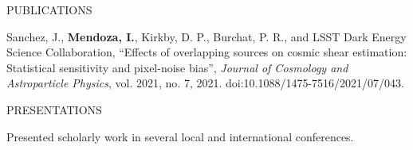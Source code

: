 \documentclass{resume} %
\begin{document}
\begin{rSection}{PUBLICATIONS}
%
\vspace*{-1em}
\item Sanchez, J., \textbf{Mendoza, I.}, Kirkby, D. P., Burchat, P. R., and LSST Dark Energy Science Collaboration, “Effects of overlapping sources on cosmic shear estimation: Statistical sensitivity and pixel-noise bias”, \textit{Journal of Cosmology and Astroparticle Physics}, vol. 2021, no. 7, 2021. doi:10.1088/1475-7516/2021/07/043.
%
\end{rSection}


\begin{rSection}{PRESENTATIONS}
%
\vspace*{-1em}
\item Presented scholarly work in several local and international conferences.
%
\end{rSection}
\end{document}
